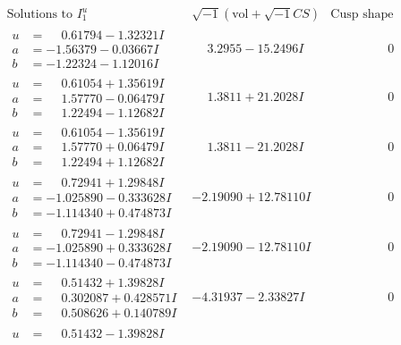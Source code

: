 \documentclass[1p]{elsarticle_modified}
\theoremstyle{definition}
\newcommand{\I}{\sqrt{-1}}
\begin{document}
$$\begin{array}{c|c|c}
\text{Solutions to }I^u_{1}& \I (\text{vol} + \sqrt{-1}CS) & \text{Cusp shape}\\
 \hline 
\begin{aligned}
u &= \phantom{-}0.61794 - 1.32321 I \\
a &= -1.56379 - 0.03667 I \\
b &= -1.22324 - 1.12016 I\end{aligned}
 & \phantom{-}3.2955 - 15.2496 I & \phantom{-0.000000 } 0 \\ \hline\begin{aligned}
u &= \phantom{-}0.61054 + 1.35619 I \\
a &= \phantom{-}1.57770 - 0.06479 I \\
b &= \phantom{-}1.22494 - 1.12682 I\end{aligned}
 & \phantom{-}1.3811 + 21.2028 I & \phantom{-0.000000 } 0 \\ \hline\begin{aligned}
u &= \phantom{-}0.61054 - 1.35619 I \\
a &= \phantom{-}1.57770 + 0.06479 I \\
b &= \phantom{-}1.22494 + 1.12682 I\end{aligned}
 & \phantom{-}1.3811 - 21.2028 I & \phantom{-0.000000 } 0 \\ \hline\begin{aligned}
u &= \phantom{-}0.72941 + 1.29848 I \\
a &= -1.025890 - 0.333628 I \\
b &= -1.114340 + 0.474873 I\end{aligned}
 & -2.19090 + 12.78110 I & \phantom{-0.000000 } 0 \\ \hline\begin{aligned}
u &= \phantom{-}0.72941 - 1.29848 I \\
a &= -1.025890 + 0.333628 I \\
b &= -1.114340 - 0.474873 I\end{aligned}
 & -2.19090 - 12.78110 I & \phantom{-0.000000 } 0 \\ \hline\begin{aligned}
u &= \phantom{-}0.51432 + 1.39828 I \\
a &= \phantom{-}0.302087 + 0.428571 I \\
b &= \phantom{-}0.508626 + 0.140789 I\end{aligned}
 & -4.31937 - 2.33827 I & \phantom{-0.000000 } 0 \\ \hline\begin{aligned}
u &= \phantom{-}0.51432 - 1.39828 I \\

\end{aligned}
\end{array}$$
\end{document}
